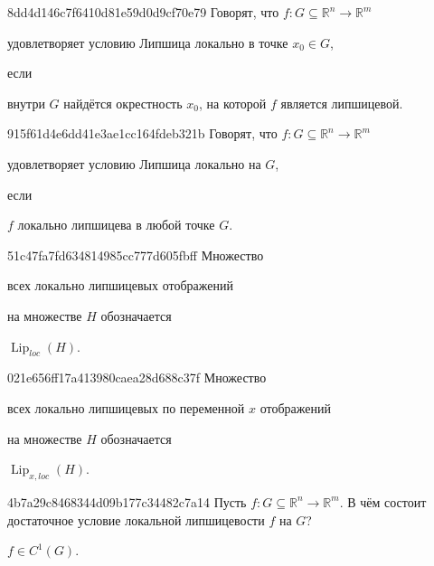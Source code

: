 \begin{note}{8dd4d146c7f6410d81e59d0d9cf70e79}
    Говорят, что \({ f : G \subseteq \mathbb R^{n} \to \mathbb R^{m} }\) \begin{icloze}{2}удовлетворяет условию Липшица локально в точке \({ x_0 \in G }\),\end{icloze} если
    \begin{icloze}{1}
        внутри \({ G }\) найдётся окрестность \({ x_0 }\), на которой \({ f }\) является липшицевой.
    \end{icloze}
\end{note}

\begin{note}{915f61d4e6dd41e3ae1cc164fdeb321b}
    Говорят, что \({ f : G \subseteq \mathbb R^{n} \to \mathbb R^{m} }\) \begin{icloze}{2}удовлетворяет условию Липшица локально на \({ G }\),\end{icloze} если
    \begin{icloze}{1}
        \({ f }\) локально липшицева в любой точке \({ G }\).
    \end{icloze}
\end{note}

\begin{note}{51c47fa7fd634814985cc777d605fbff}
    Множество \begin{icloze}{2}всех локально липшицевых отображений\end{icloze} на множестве \({ H }\) обозначается \begin{icloze}{1}\({ \operatorname{Lip}_{loc}(H) }\).\end{icloze}
\end{note}

\begin{note}{021e656ff17a413980caea28d688c37f}
    Множество \begin{icloze}{2}всех локально липшицевых по переменной \({ x }\) отображений\end{icloze} на множестве \({ H }\) обозначается \begin{icloze}{1}\({ \operatorname{Lip}_{x, loc}(H) }\).\end{icloze}
\end{note}

\begin{note}{4b7a29c8468344d09b177c34482c7a14}
    Пусть \({ f : G \subseteq \mathbb R^{n} \to \mathbb R^{m} }\).
    В чём состоит достаточное условие локальной липшицевости \({ f }\) на \({ G }\)?

    \begin{cloze}{1}
        \({ f \in C^{1}(G) }\).
    \end{cloze}
\end{note}

